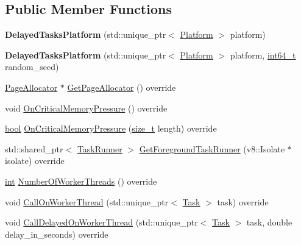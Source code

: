 \subsection*{Public Member Functions}
\begin{DoxyCompactItemize}
\item 
\mbox{\label{classv8_1_1DelayedTasksPlatform_a737101bcc278bcd14dbd85f9c0bee5d8}} 
{\bfseries Delayed\+Tasks\+Platform} (std\+::unique\+\_\+ptr$<$ \mbox{\hyperlink{classv8_1_1Platform}{Platform}} $>$ platform)
\item 
\mbox{\label{classv8_1_1DelayedTasksPlatform_afa0ffebf0c4e0f43796bd8bf9e8953b4}} 
{\bfseries Delayed\+Tasks\+Platform} (std\+::unique\+\_\+ptr$<$ \mbox{\hyperlink{classv8_1_1Platform}{Platform}} $>$ platform, \mbox{\hyperlink{classint64__t}{int64\+\_\+t}} random\+\_\+seed)
\item 
\mbox{\hyperlink{classv8_1_1PageAllocator}{Page\+Allocator}} $\ast$ \mbox{\hyperlink{classv8_1_1DelayedTasksPlatform_aa4c38247e7c468f4ad4f449451bb08ae}{Get\+Page\+Allocator}} () override
\item 
void \mbox{\hyperlink{classv8_1_1DelayedTasksPlatform_a3f545fedfc3298d49a02b4b9f4aa500c}{On\+Critical\+Memory\+Pressure}} () override
\item 
\mbox{\hyperlink{classbool}{bool}} \mbox{\hyperlink{classv8_1_1DelayedTasksPlatform_a0e71d1dd7f3096bccd5a118506e87597}{On\+Critical\+Memory\+Pressure}} (\mbox{\hyperlink{classsize__t}{size\+\_\+t}} length) override
\item 
std\+::shared\+\_\+ptr$<$ \mbox{\hyperlink{classv8_1_1TaskRunner}{Task\+Runner}} $>$ \mbox{\hyperlink{classv8_1_1DelayedTasksPlatform_a822079611fe0e01d3bc5dcf5eaa7f811}{Get\+Foreground\+Task\+Runner}} (v8\+::\+Isolate $\ast$isolate) override
\item 
\mbox{\hyperlink{classint}{int}} \mbox{\hyperlink{classv8_1_1DelayedTasksPlatform_a1a3aa3e67db9adaac185eeac940e6a97}{Number\+Of\+Worker\+Threads}} () override
\item 
void \mbox{\hyperlink{classv8_1_1DelayedTasksPlatform_a9c9cbee600d68caf36aa3c0555ff567f}{Call\+On\+Worker\+Thread}} (std\+::unique\+\_\+ptr$<$ \mbox{\hyperlink{classv8_1_1Task}{Task}} $>$ task) override
\item 
void \mbox{\hyperlink{classv8_1_1DelayedTasksPlatform_aeb214faee105e6335c5a93601cac54c7}{Call\+Delayed\+On\+Worker\+Thread}} (std\+::unique\+\_\+ptr$<$ \mbox{\hyperlink{classv8_1_1Task}{Task}} $>$ task, double delay\+\_\+in\+\_\+seconds) override

\end{DoxyCompactItemize}
